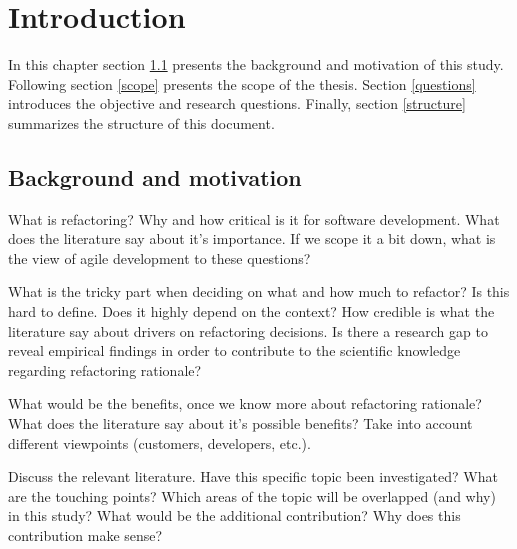 \documentclass[english,12pt,a4paper,pdftex,sci,utf8]{aaltothesis}
\begin{document}


\newpage


\thesistableofcontents


\cleardoublepage
\storeinipagenumber
{}
\setcounter{page}{1}


\section{Introduction} \label{introduction}
In this chapter section \ref{background} presents the background and motivation of this study. Following section \ref{scope} presents the scope of the thesis. Section \ref{questions} introduces the objective and research questions. Finally, section \ref{structure} summarizes the structure of this document. 
\subsection{Background and motivation} \label{background}
What is refactoring? Why and how critical is it for software development. What does the literature say about it's importance. If we scope it a bit down, what is the view of agile development to these questions?

What is the tricky part when deciding on what and how much to refactor? Is this hard to define. Does it highly depend on the context? How credible is what the literature say about drivers on refactoring decisions. Is there a research gap to reveal empirical findings in order to contribute to the scientific knowledge regarding refactoring rationale?

What would be the benefits, once we know more about refactoring rationale? What does the literature say about it's possible benefits? Take into account different viewpoints (customers, developers, etc.).

Discuss the relevant literature. Have this specific topic been investigated? What are the touching points? Which areas of the topic will be overlapped (and why) in this study? What would be the additional contribution? Why does this contribution make sense?
\end{document}
